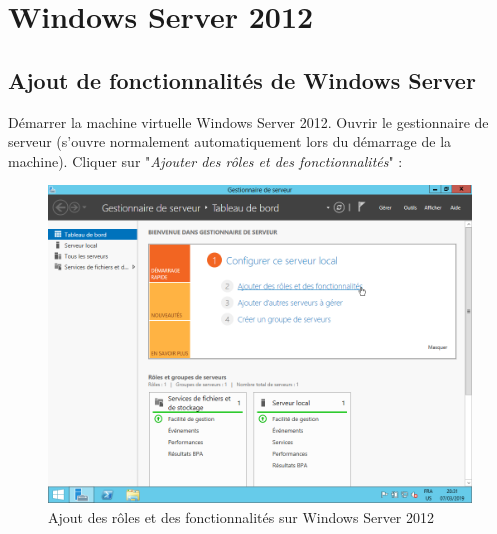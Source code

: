 \section{Windows Server 2012}
\subsection{Ajout de fonctionnalités de Windows Server}

Démarrer la machine virtuelle Windows Server 2012. Ouvrir le gestionnaire de serveur (s'ouvre normalement automatiquement lors du démarrage de la machine). Cliquer sur "\textit{Ajouter des rôles et des fonctionnalités}" :
\begin{figure}[h!]
    \begin{center}
        \includegraphics[scale=0.6]{WS2012_Screenshots/17.png}
        \caption{Ajout des rôles et des fonctionnalités sur Windows Server 2012}
        \label{WS2012_Screenshots/17}
    \end{center}
\end{figure}
\FloatBarrier

